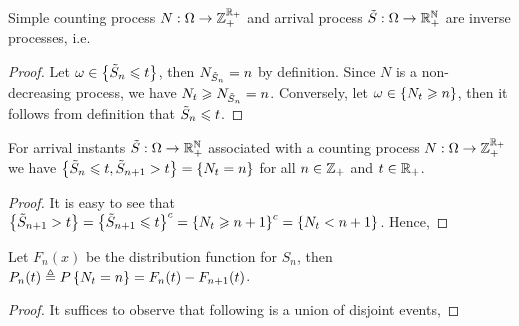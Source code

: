 \documentclass[letterpaper,10pt,english]{article}
\begin{document}
\begin{lem} 
Simple counting process $N:\Omega\to\mathbb{Z}_+^{\mathbb{R}_+}$ and arrival process $\tilde{S}:\Omega\to\mathbb{R}_+^{\mathbb{N}}$ are inverse processes, i.e. 
\end{lem}
\begin{proof} 
Let $\omega \in \left\{\tilde{S}_n \leqslant t\right\}$, then $N_{\tilde{S}_n} = n$ by definition. 
Since $N$ is a non-decreasing process, we have $N_t \geqslant N_{\tilde{S}_n} = n$. 
Conversely, let $\omega \in \left\{N_t \geqslant n\right\}$, then it follows from definition that $\tilde{S}_n \leqslant t$.
\end{proof}
\begin{cor} 
For arrival instants $\tilde{S}:\Omega\to\mathbb{R}_+^{\mathbb{N}}$ associated with a counting process $N:\Omega\to\mathbb{Z}_+^{\mathbb{R}_+}$ 
we have 
$
\left\{\tilde{S}_n \leqslant t, \tilde{S}_{n+1} > t\right\} = \left\{N_t = n\right\} 
$
for all $n \in \mathbb{Z}_+$ and $t \in \mathbb{R}_+$. 
\end{cor}
\begin{proof}
It is easy to see that 
$\left\{\tilde{S}_{n+1} > t \right\} = \left\{\tilde{S}_{n+1} \leqslant t\right\}^c = \left\{N_t \geqslant n+1\right\}^c = \left\{N_t < n+1\right\}$.
Hence, %
\end{proof}
\begin{lem}
Let $F_n(x)$ be the distribution function for $S_n$, then 
$P_n(t) \triangleq P\left\{N_t = n\right\} = F_{n}(t)-F_{n+1}(t)$. 
\end{lem}
\begin{proof} It suffices to observe that following is a union of disjoint events,
\end{proof}
\end{document}
